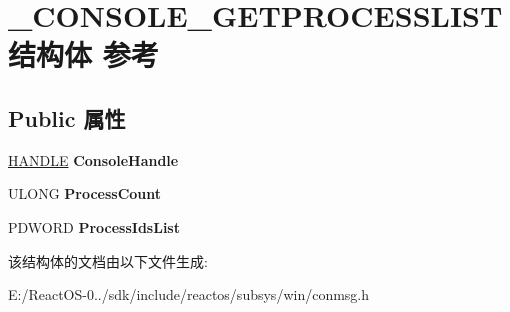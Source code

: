 \hypertarget{struct___c_o_n_s_o_l_e___g_e_t_p_r_o_c_e_s_s_l_i_s_t}{}\section{\+\_\+\+C\+O\+N\+S\+O\+L\+E\+\_\+\+G\+E\+T\+P\+R\+O\+C\+E\+S\+S\+L\+I\+S\+T结构体 参考}
\label{struct___c_o_n_s_o_l_e___g_e_t_p_r_o_c_e_s_s_l_i_s_t}
\subsection*{Public 属性}
\begin{DoxyCompactItemize}
\item 
\mbox{\label{struct___c_o_n_s_o_l_e___g_e_t_p_r_o_c_e_s_s_l_i_s_t_a753eff814fd15ed257b19bd09e2b7641}} 
\hyperlink{interfacevoid}{H\+A\+N\+D\+LE} {\bfseries Console\+Handle}
\item 
\mbox{\label{struct___c_o_n_s_o_l_e___g_e_t_p_r_o_c_e_s_s_l_i_s_t_a46386a206559f5ae80c25ee6c126e964}} 
U\+L\+O\+NG {\bfseries Process\+Count}
\item 
\mbox{\label{struct___c_o_n_s_o_l_e___g_e_t_p_r_o_c_e_s_s_l_i_s_t_ae22bb185a75c469b8832d3bebc8bdb44}} 
P\+D\+W\+O\+RD {\bfseries Process\+Ids\+List}
\end{DoxyCompactItemize}


该结构体的文档由以下文件生成\+:\begin{DoxyCompactItemize}
\item 
E\+:/\+React\+O\+S-\/0../sdk/include/reactos/subsys/win/conmsg.\+h\end{DoxyCompactItemize}
